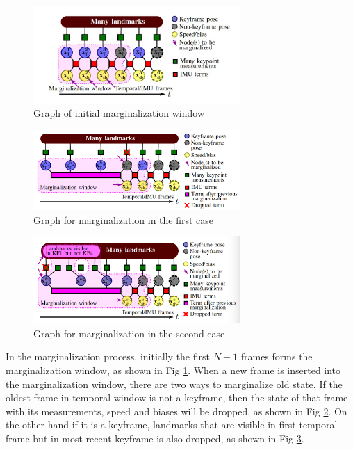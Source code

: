 \documentclass[12pt,twoside]{article}
\begin{document}
\\
\begin{figure}[h]
    \centering
    \includegraphics[width=0.7\textwidth]{figures/okvis1}
    \caption{Graph of initial marginalization window \cite{leutenegger2015keyframe}}
    \label{fig:okvis1}
\end{figure}
\begin{figure}[h]
    \centering
    \includegraphics[width=0.7\textwidth]{figures/okvis2}
     \caption{Graph for marginalization in the first case \cite{leutenegger2015keyframe}}
    \label{fig:okvis2}
\end{figure}
\begin{figure}[h]
    \centering
    \includegraphics[width=0.7\textwidth]{figures/okvis3}
   \caption{Graph for marginalization in the second case \cite{leutenegger2015keyframe}}
    \label{fig:okvis3}
\end{figure}
In the marginalization process, initially the first $N+1$ frames forms the marginalization window, as shown in Fig \ref{fig:okvis1}. When a new frame is inserted into the marginalization window, there are two ways to marginalize old state. If the oldest frame in temporal window is not a keyframe, then the state of that frame with its measurements, speed and biases will be dropped, as shown in Fig \ref{fig:okvis2}. On the other hand if it is a keyframe, landmarks that are visible in first temporal frame but in most recent keyframe is also dropped, as shown in Fig \ref{fig:okvis3}.\\
\end{document}

